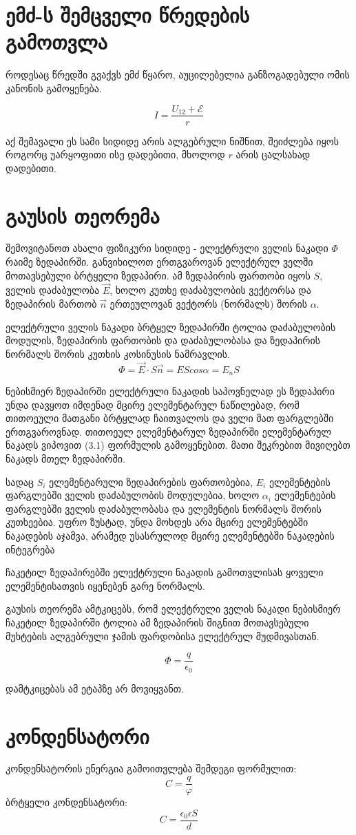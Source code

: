 \documentclass[a4paper]{book}
\begin{document}
\section{ემძ-ს შემცველი წრედების გამოთვლა}
როდესაც წრედში გვაქვს ემძ წყარო, აუცილებელია განზოგადებული ომის კანონის გამოყენება. 

$$I = \frac{U_{12} + \mathcal{E}}{r}$$

აქ შემავალი ეს სამი სიდიდე არის ალგებრული ნიშნით, შეიძლება იყოს როგორც უარყოფითი ისე დადებითი, მხოლოდ $r$ არის ცალსახად დადებითი.
\section{გაუსის თეორემა}
შემოვიტანოთ ახალი ფიზიკური სიდიდე - ელექტრული ველის ნაკადი $\Phi$ რაიმე ზედაპირში. განვიხილოთ ერთგვაროვან ელექტრულ ველში მოთავსებული ბრტყელი ზედაპირი. ამ ზედაპირის ფართობი იყოს $S$, ველის დაძაბულობა $\vec{E}$, ხოლო კუთხე დაძაბულობის ვექტორსა და ზედაპირის მართობ $\vec{n}$ ერთეულოვან ვექტორს (ნორმალს) შორის $\alpha$.

ელექტრული ველის ნაკადი ბრტყელ ზედაპირში ტოლია დაძაბულობის მოდულის, ზედაპირის ფართობის და დაძაბულობასა და ზედაპირის ნორმალს შორის კუთხის კოსინუსის ნამრავლის.
	$$\Phi = \vec{E}\cdot S\vec{n}=EScos\alpha=E_n S$$

ნებისმიერ ზედაპირში ელექტრული ნაკადის საპოვნელად ეს ზედაპირი უნდა დავყოთ იმდენად მცირე ელემენტარულ ნაწილებად, რომ თითოეული მათგანი ბრტყლად ჩაითვალოს და ველი მათ ფარგლებში ერთგვაროვნად. თითოეულ ელემენტარულ ზედაპირში ელემენტარულ ნაკადს ვიპოვით (3.1) ფორმულის გამოყენებით. მათი შეკრებით მივიღებთ ნაკადს მთელ ზედაპირში.

სადაც $S_i$ ელემენტარული ზედაპირების ფართობებია, $E_i$ ელემენტების ფარგლებში ველის დაძაბულობის მოდულებია, ხოლო $\alpha_i$ ელემენტების ფარგლებში ველის დაძაბულობასა და ელემენტის ნორმალს შორის კუთხეებია. უფრო ზუსტად, უნდა მოხდეს არა მცირე ელემენტებში ნაკადების აჯამვა, არამედ უსასრულოდ მცირე ელემენტებში ნაკადების ინტეგრება

ჩაკეტილ ზედაპირებში ელექტრული ნაკადის გამოთვლისას ყოველი
ელემენტისათვის იყენებენ გარე ნორმალს.
 
გაუსის თეორემა ამტკიცებს, რომ ელექტრული ველის ნაკადი ნებისმიერ ჩაკეტილ ზედაპირში ტოლია ამ ზედაპირის შიგნით მოთავსებული მუხტების ალგებრული ჯამის ფარდობისა ელექტრულ მუდმივასთან.

$$\Phi = \frac{q}{\epsilon_0}$$

დამტკიცებას ამ ეტაპზე არ მოვიყვანთ.
\section{კონდენსატორი}
კონდენსატორის ენერგია გამოითვლება შემდეგი ფორმულით:
$$C = \frac{q}{\varphi}$$
ბრტყელი კონდენსატორი:
$$C = \frac{\epsilon_0 \epsilon S}{d}$$
\end{document}
